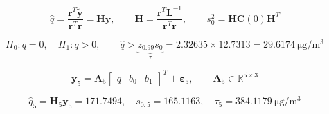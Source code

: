 \documentclass{article}
\begin{document}
\newpage
\[\displaystyle \widehat q=\frac{\mathbf r^T\widetilde{\mathbf y}}{\mathbf r^T\mathbf r}=\mathbf H\mathbf y,\qquad\mathbf H=\frac{\mathbf r^T\mathbf L^{-1}}{\mathbf r^T\mathbf r},\qquad s_0^2=\mathbf H\mathbf C(0)\mathbf H^T\]

\newpage
\[\displaystyle H_0:q=0,\quad H_1:q>0,\qquad\widehat q>\underbrace{z_{0.99}s_0}_{\tau}=2.32635\times12.7313=29.6174\ \mathrm{\mu g/m^3}\]

\newpage
\[\displaystyle \mathbf y_5=\mathbf A_5\begin{bmatrix}q&b_0&b_1\end{bmatrix}^{T}+\boldsymbol\varepsilon_5,\qquad\mathbf A_5\in\mathbb R^{5\times3}\]

\newpage
\[\displaystyle \widehat q_5=\mathbf H_5\mathbf y_5=171.7494,\quad s_{0,5}=165.1163,\quad\tau_5=384.1179\ \mathrm{\mu g/m^3}\]
\end{document}
